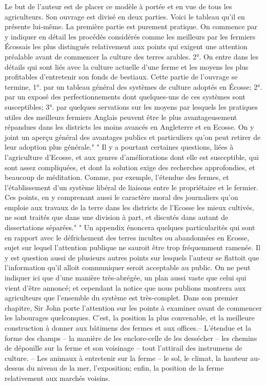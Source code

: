 Le but de l'auteur est de placer ce modèle à portée et en vue de tous les agriculteurs. Son ouvrage est divisé en deux parties. Voici le tableau qu'il en présente lui-même. La première partie est purement pratique. On commence par y indiquer en détail les procédés considérés comme les meilleurs par les fermiers Écossais les plus distingués relativement aux points qui exigent une attention préalable avant de commencer la culture des terres arables. 2°. On entre dans les détails qui sont liés avec la culture actuelle d'une ferme et les moyens les plus profitables d'entretenir son fonds de bestiaux. Cette partie de l'ouvrage se termine, 1°. par un tableau général des systèmes de culture adoptés en Écosse; 2°. par un exposé des perfectionnements dont quelques-uns de ces systèmes sont susceptibles; 3°. par quelques\setcounter{page}{414} servations sur les moyens par lesquels les pratiques utiles des meilleurs fermiers Anglais peuvent être le plus avantageusement répandues dans les districts les moins avancés en Angleterre et en Ecosse. On y joint un aperçu général des avantages publics et particuliers qu'on peut retirer de leur adoption plus générale."
" Il y a pourtant certaines questions, liées à l'agriculture d'Ecosse, et aux genres d'améliorations dont elle est susceptible, qui sont assez compliquées, et dont la solution exige des recherches approfondies, et beaucoup de méditation. Comme, par exemple, l'étendue des fermes, et l'établissement d'un système libéral de liaisons entre le propriétaire et le fermier. Ces points, en y comprenant aussi le caractère moral des journaliers qu'on emploie aux travaux de la terre dans les districts de l'Ecosse les mieux cultivés, ne sont traités que dans une division à part, et discutés dans autant de dissertations séparées."
" Un appendix énoncera quelques particularités qui sont en rapport avec le défrichement des terres incultes ou abandonnées en Ecosse, sujet sur lequel l'attention publique ne sauroit être trop fréquemment ramenée. Il y est question aussi de plusieurs autres points sur lesquels l'auteur se flattoit\setcounter{page}{415} que l'information qu'il alloit communiquer seroit acceptable au public.
On ne peut indiquer ici que d'une manière très-abrégée, un plan aussi vaste que celui qui vient d'être annoncé; et cependant la notice que nous publions montrera aux agriculteurs que l'ensemble du système est très-complet.
Dans son premier chapitre, Sir John porte l'attention sur les points à examiner avant de commencer les labourages quelconques. C'est, la position la plus convenable, et la meilleure construction à donner aux bâtimens des fermes et aux offices.-- L'étendue et la forme des champs -- la manière de les enclore-celle de les dessécher -- les chemins de dépouille sur la ferme et son voisinage -- tout l'attirail des instrumens de culture. -- Les animaux à entretenir sur la ferme -- le sol, le climat, la hauteur au-dessus du niveau de la mer, l'exposition; enfin, la position de la ferme relativement aux marchés voisins.
